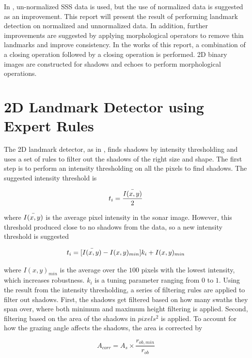 In \cite{Al-Rawi2017LandmarkImages}, un-normalized SSS data is used, but the use of normalized data is suggested as an improvement. This report will present the result of performing landmark detection on normalized and unnormalized data. In addition, further improvements are suggested by applying morphological operators to remove thin landmarks and improve consistency. In the works of this report, a combination of a closing operation followed by a closing operation is performed. 2D binary images are constructed for shadows and echoes to perform morphological operations.  

\section{2D Landmark Detector using Expert Rules}

The 2D landmark detector, as in \cite{Leblond2019SonarProject}, finds shadows by intensity thresholding and uses a set of rules to filter out the shadows of the right size and shape. The first step is to perform an intensity thresholding on all the pixels to find shadows. The suggested intensity threshold is

\begin{equation}
    t_i = \frac{\Bar{I(x,y)}}{2}
    \label{eq:orginal_int_thres}
\end{equation}

where $\Bar{I(x,y)}$ is the average pixel intensity in the sonar image. However, this threshold produced close to no shadows from the data, so a new intensity threshold is suggested

\begin{equation}
    t_i = [\Bar{I(x,y)} - I(x,y)_{min}] k_i + I(x,y)_{min} 
\end{equation}

where $I(x,y)_{min}$ is the average over the $100$ pixels with the lowest intensity, which increases robustness. $k_i$ is a tuning parameter ranging from $0$ to $1$. Using the result from the intensity thresholding, a series of filtering rules are applied to filter out shadows. First, the shadows get filtered based on how many swaths they span over, where both minimum and maximum height filtering is applied. Second, filtering based on the area of the shadows in $pixels^2$ is applied. To account for how the grazing angle affects the shadows, the area is corrected by

\begin{equation}
    A_{corr} = A_s \times \frac{r_{ob,min}}{r_{ob}}
    \label{eq:corrected_area}
\end{equation}

